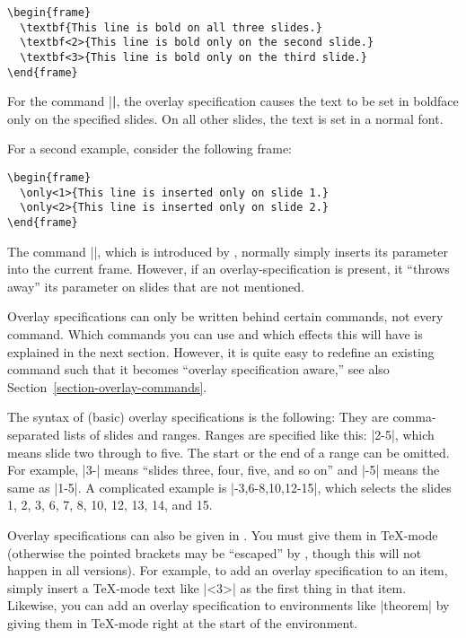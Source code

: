 \begin{verbatim}
\begin{frame}
  \textbf{This line is bold on all three slides.}
  \textbf<2>{This line is bold only on the second slide.}
  \textbf<3>{This line is bold only on the third slide.}
\end{frame}
\end{verbatim}

For the command |\textbf|, the overlay specification causes the
text to be set in boldface only on the specified slides. On all other
slides, the text is set in a normal font.

For a second example, consider the following frame:
\begin{verbatim}
\begin{frame}
  \only<1>{This line is inserted only on slide 1.}
  \only<2>{This line is inserted only on slide 2.}
\end{frame}
\end{verbatim}

The command |\only|, which is introduced by \beamer, normally simply
inserts its parameter into the current frame. However, if an
overlay-specification is present, it ``throws away'' its parameter on
slides that are not mentioned.

Overlay specifications can only be written behind certain commands,
not every command. Which commands you can use and which effects this
will have is explained in the next section. However, it is quite
easy to redefine an existing command such that it becomes ``overlay
specification aware,'' see also
Section~\ref{section-overlay-commands}.

The syntax of (basic) overlay specifications is the following: They
are comma-separated lists of slides and ranges. Ranges are specified
like this: |2-5|, which means slide two through to five. The start or
the end of a range can be omitted. For example, |3-| means
``slides three, four, five, and so on'' and |-5| means the same as
|1-5|. A complicated example is |-3,6-8,10,12-15|, which selects the
slides 1, 2, 3, 6, 7, 8, 10, 12, 13, 14, and 15.


\lyxnote
Overlay specifications can also be given in \LyX. You must give them
in \TeX-mode (otherwise the pointed brackets may be ``escaped'' by
\LyX, though this will not happen in all versions). For example, to
add an overlay specification to an item, simply insert a \TeX-mode
text like |<3>| as the first thing in that item. Likewise, you can add
an overlay specification to environments like |theorem| by giving
them in \TeX-mode right at the start of the environment.


